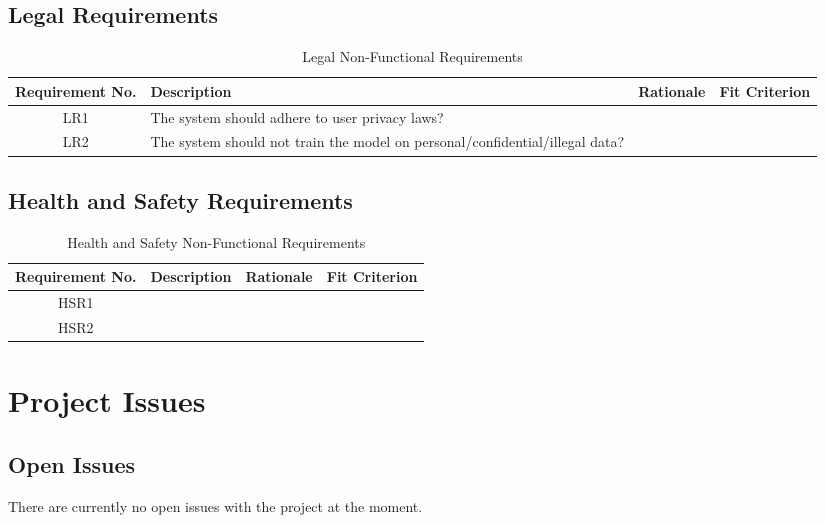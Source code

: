 \documentclass[12pt, titlepage]{article}
\begin{document}
\subsection{Legal Requirements}

\begin{table}[H]
\caption{Legal Non-Functional Requirements}
\noindent \begin{tabular}{| c | p{3cm}| p{3cm}| p{3cm}|}
\toprule 
\textbf{Requirement No.} & \textbf{Description} & \textbf{Rationale} & \textbf{Fit Criterion}\\
\midrule
LR1 & The system should adhere to user privacy laws?  & & \\
\hline
LR2 & The system should not train the model on personal/confidential/illegal data? & & \\
\bottomrule
\end{tabular}
\end{table}

\subsection{Health and Safety Requirements}

\begin{table}[H]
\caption{Health and Safety Non-Functional Requirements}
\noindent \begin{tabular}{| c | p{3cm}| p{3cm}| p{3cm}|}
\toprule 
\textbf{Requirement No.} & \textbf{Description} & \textbf{Rationale} & \textbf{Fit Criterion}\\
\midrule
HSR1 &  & & \\
\hline
HSR2 & & & \\
\bottomrule
\end{tabular}
\end{table}

\section{Project Issues}

\subsection{Open Issues}
There are currently no open issues with the project at the moment.
\end{document}
